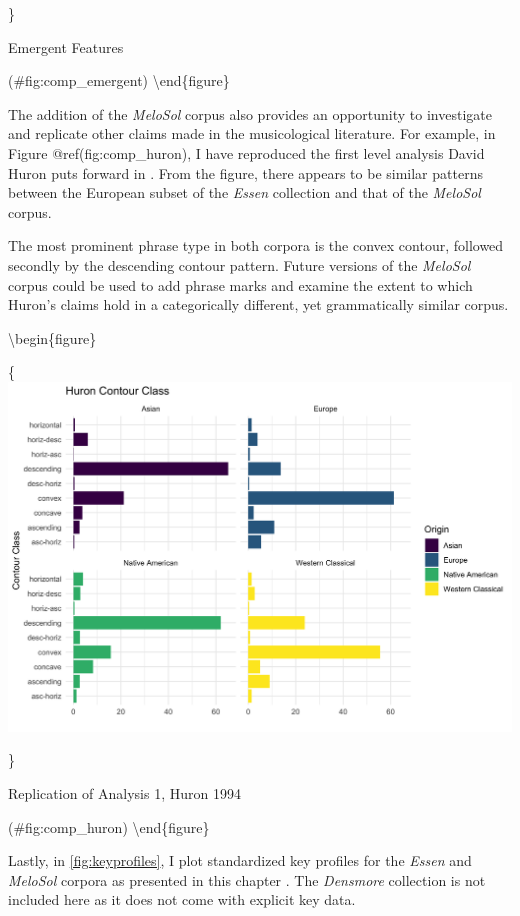 \documentclass[]{book}
\begin{document}
\}

\caption{Emergent Features}

(\#fig:comp\_emergent)
\textbackslash{}end\{figure\}

The addition of the \emph{MeloSol} corpus also provides an opportunity to investigate and replicate other claims made in the musicological literature.
For example, in Figure @ref(fig:comp\_huron), I have reproduced the first level analysis David Huron puts forward in \citep{huronMelodicArchWestern1996}.
From the figure, there appears to be similar patterns between the European subset of the \emph{Essen} collection and that of the \emph{MeloSol} corpus.

The most prominent phrase type in both corpora is the convex contour, followed secondly by the descending contour pattern.
Future versions of the \emph{MeloSol} corpus could be used to add phrase marks and examine the extent to which Huron's claims hold in a categorically different, yet grammatically similar corpus.

\textbackslash{}begin\{figure\}

\{\centering \includegraphics[width=1\linewidth]{img/huron_recreation}

\}

\caption{Replication of Analysis 1, Huron 1994}

(\#fig:comp\_huron)
\textbackslash{}end\{figure\}

Lastly, in \ref{fig:keyprofiles}, I plot standardized key profiles for the \emph{Essen} and \emph{MeloSol} corpora as presented in this chapter \citep{krumhanslCognitiveFoundationsMusical2001}.
The \emph{Densmore} collection is not included here as it does not come with explicit key data.
\end{document}
